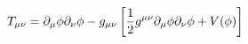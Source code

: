 \begin{equation}
T_{\mu \nu}=\partial_{\mu} \phi \partial_{\nu} \phi-g_{\mu \nu} \left[{1 \over 2}g^{\mu \nu} \partial_{\mu} \phi \partial_{\nu} \phi+V(\phi)\right]
\end{equation}

